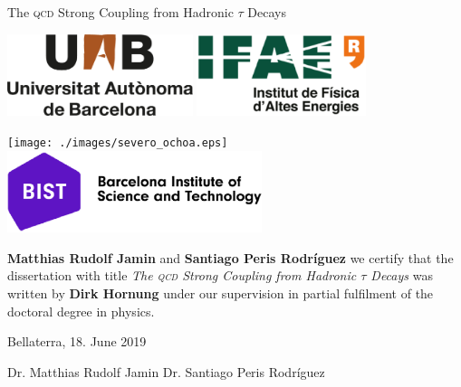 \documentclass[12pt,a4paper,openright]{scrreprt}
\makeatletter
\numberwithin{equation}{section}       %
\let\org@subfile
\renewcommand*{}[1]{%
  \filename@parse{#1}%
  \expandafter
  \graphicspath\expandafter{\expandafter{\filename@area}}%
  \org@subfile{#1}%
}
\makeatother
\begin{document}
\begin{center}
  \Large The \textsc{qcd} Strong Coupling from Hadronic \(\tau\) Decays

  \makebox[\linewidth]{\rule{\textwidth}{1pt}}

  \vspace{2cm}

  \includegraphics[height=2.4cm]{./images/logo_UAB.eps} \hfill
  \includegraphics[height=2.4cm]{./images/logo_IFAE.eps}

  \vspace{1cm}

  \texttt{[image: ./images/severo\_ochoa.eps]} \hfill
  \includegraphics[height=2.4cm]{./images/bist.eps}

  \vspace{3cm}
\end{center}

\begin{large}
  \textbf{Matthias Rudolf Jamin} and \textbf{Santiago Peris Rodríguez} we
  certify that the dissertation with title \textit{The \textsc{qcd} Strong
    Coupling from Hadronic \(\tau\) Decays} was written by \textbf{Dirk Hornung}
  under our supervision in partial fulfilment of the doctoral degree in physics.

  \vfill Bellaterra, 18. June 2019 \par
  \vspace{4cm}
  Dr. Matthias Rudolf Jamin \hfill Dr. Santiago Peris Rodríguez
  \vspace{1cm}
\end{large}


  



\setcounter{tocdepth}{1}
\tableofcontents

\newpage
{}





\appendix

\printnomenclature
\printbibliography[heading=bibintoc]
\end{document}
